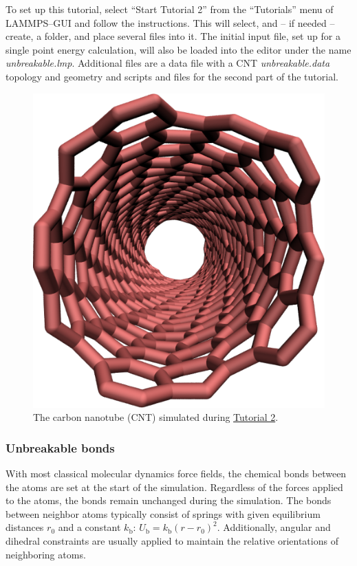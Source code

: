 \documentclass[9pt,tutorial]{livecoms}
\begin{document}
To set up this tutorial, select ``Start Tutorial 2'' from the
``Tutorials'' menu of LAMMPS--GUI and follow the instructions.  This
will select, and -- if needed -- create, a folder, and place several
files into it.  The initial input file, set up for a single point energy
calculation, will also be loaded into the editor under the name
\textit{unbreakable.lmp}.  Additional files are a data file with a CNT
\textit{unbreakable.data} topology and geometry and scripts and files
for the second part of the tutorial.

\begin{figure}
\centering
\includegraphics[width=0.55\linewidth]{CNT}
\caption{The carbon nanotube (CNT) simulated during
\hyperref[carbon-nanotube-label]{Tutorial 2}.}
\label{fig:CNT}
\end{figure}

\subsubsection{Unbreakable bonds}
With most classical molecular dynamics force fields, the chemical bonds
between the atoms are set at the start of the simulation. Regardless of
the forces applied to the atoms, the bonds remain unchanged during the
simulation. The bonds between neighbor atoms typically consist of
springs with given equilibrium distances $r_0$ and a constant
$k_\text{b}$: $U_\text{b} = k_\text{b} \left( r - r_0
\right)^2$. Additionally, angular and dihedral constraints are usually
applied to maintain the relative orientations of neighboring atoms.
\end{document}
